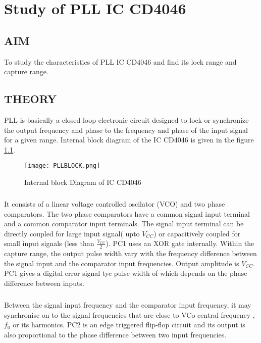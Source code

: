 \chapter[Study of PLL IC CD4046]{Study of PLL IC CD4046}

\section*{AIM}

To study the characteristics of PLL IC CD4046 and find its lock range and capture range.
\section*{THEORY}

PLL is basically a closed loop electronic circuit designed to lock or synchronize the output frequency and phase to the frequency and phase of the input signal for a given range. Internal block diagram of the IC CD4046 is given in the figure \ref{PLLBLOCK}.
\begin{figure}
    \texttt{[image: PLLBLOCK.png]}
    \caption{Internal block Diagram of IC CD4046}
    \label{PLLBLOCK}
\end{figure}

\paragraph{}


It consists of a  linear voltage controlled oscilator (VCO) and two phase comparators. The two phase comparators have a common signal input terminal and a common comparator input terminals. The signal input terminal can be directly coupled for large input signal( upto $V_{CC}$) or capacitively coupled for small input signals (less than $\frac{	V_{CC}}{2}$). PC1 uses an XOR gate internally. Within the capture range, the output pulse width vary with the frequency difference between the signal input and the comparator input frequencies. Output amplitude is $V_{CC}$. PC1 gives a digital error signal tye pulse width of which depends on the phase difference between inputs. 

\paragraph{}Between the signal input frequency and the comparator input frequency, it may synchronise on to the signal frequencies that are close to VCo central frequency , $f_0$
or its harmonics.  PC2 is an edge triggered flip-flop circuit and its output is also proportional to the phase difference between two input frequencies. 

